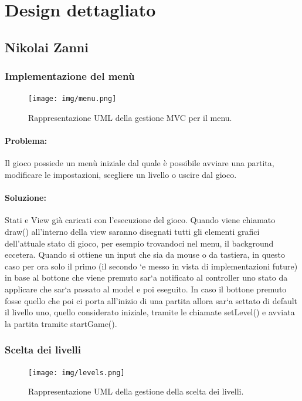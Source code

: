 \documentclass[a4paper,12pt]{report}
\begin{document}
\section{Design dettagliato}
\subsection{Nikolai Zanni}

\subsubsection{Implementazione del menù}

\begin{figure}[H]
\centering{}
\texttt{[image: img/menu.png]}
\caption{Rappresentazione UML della gestione MVC per il menu.}
\end{figure}

\paragraph{Problema:}
Il gioco possiede un menù iniziale dal quale è possibile avviare una partita, modificare le impostazioni, scegliere un livello o uscire dal gioco.

\paragraph{Soluzione:}
Stati e View già caricati con l'esecuzione del gioco. Quando viene chiamato draw() all’interno della view saranno disegnati tutti gli elementi grafici dell’attuale stato di gioco, per esempio trovandoci nel menu, il background eccetera. Quando si ottiene un input che sia da mouse o da tastiera, in questo caso per ora solo il primo (il secondo `e messo in vista di implementazioni future) in base al bottone che viene premuto sar`a notificato al controller uno stato da applicare che sar`a passato al model e poi eseguito. In caso il bottone premuto fosse quello che poi ci porta all’inizio di una partita allora sar`a settato di default il livello uno, quello considerato iniziale, tramite le chiamate setLevel() e avviata la partita tramite startGame().

\subsubsection{Scelta dei livelli}

\begin{figure}[H]
\centering{}
\texttt{[image: img/levels.png]}
\caption{Rappresentazione UML della gestione della scelta dei livelli.}
\end{figure}
\end{document}
